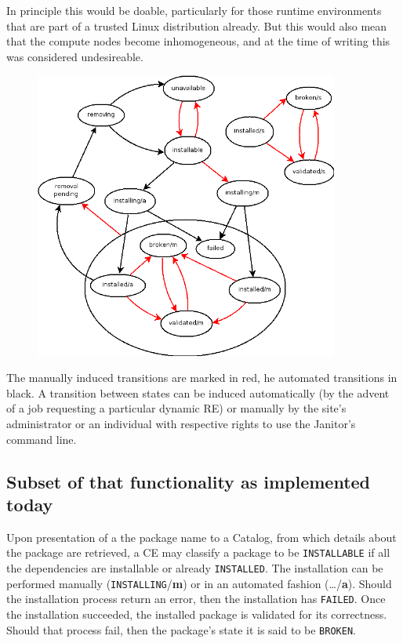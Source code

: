 In principle this would be doable, particularly for those runtime 
environments that are part of a trusted Linux distribution already.
But this would also mean that the compute nodes become inhomogeneous,
and at the time of writing this was considered undesireable.

\begin{figure}[!h]
  \begin{center}
    \includegraphics[width=10cm]{images/RE_states.png}
    \label{fig:RE_states}
  \end{center}
\end{figure}
 
The manually induced transitions are marked in red, he automated transitions in black.
A transition between states can be induced automatically (\ie by the
advent of a job requesting a particular dynamic RE) or manually by the
site's administrator or an individual with respective rights to use the
Janitor's command line.

\subsection{Subset of that functionality as implemented today}
Upon presentation of a the package name to a Catalog, from which
details about the package are retrieved, a CE may
classify a package to be \texttt{INSTALLABLE} if all the dependencies
are installable or already \texttt{INSTALLED}. The installation can be
performed manually (\texttt{INSTALLING}/{\bf m}) or in an automated fashion
(\ldots/{\bf a}). Should the installation process return an error, then
the installation has \texttt{FAILED}. Once the installation succeeded,
the installed package is validated for its correctness. Should that
process fail, then the package's state it is said to be \texttt{BROKEN}.

